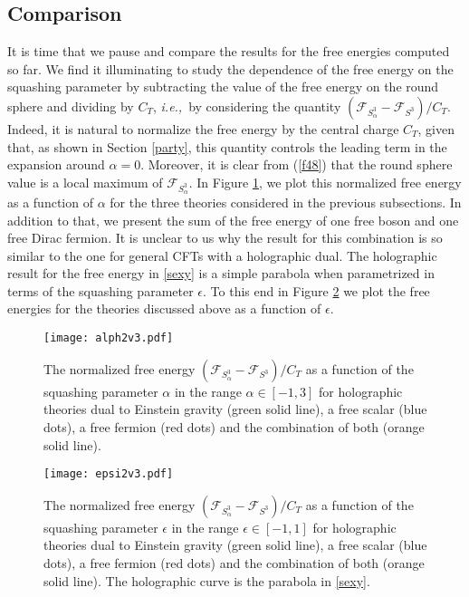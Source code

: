 \documentclass[12pt]{article}
\numberwithin{equation}{section}
\newcommand{\req}[1]{(\ref{#1})} %
\newcommand{\ssc}{\scriptscriptstyle}
\newcommand{\ie}{{\it i.e.,}\ }
\newcommand{\ctt}{C_{\ssc T}}
\begin{document}
\subsection{Comparison}
\label{susti}

It is time that we pause and compare the results for the free energies computed so far. We find it illuminating to study the dependence of the free energy on the squashing parameter by subtracting the value of the free energy on the round sphere and dividing by $\ctt$, \ie by considering the quantity $(\mathcal{F}_{S^3_{\alpha}}-\mathcal{F}_{S^3})/\ctt$.  Indeed, it is natural to normalize the free energy by the central charge $\ctt$, given that, as shown in Section \ref{party}, this quantity controls the leading term in the expansion around $\alpha=0$. Moreover, it is clear from \req{f48} that the round sphere value is a local maximum of $\mathcal{F}_{S^3_{\alpha}}$. In Figure \ref{fig3dalpha}, we plot this normalized free energy as a function of $\alpha$ for the three theories considered in the previous subsections. In addition to that, we present the sum of the free energy of one free boson and one free Dirac fermion. It is unclear to us why the result for this combination is so similar to the one for general CFTs with a holographic dual. The holographic result for the free energy in \eqref{sexy} is a simple parabola when parametrized in terms of the squashing parameter $\epsilon$. To this end in Figure \ref{fig3deps} we plot the free energies for the theories discussed above as a function of $\epsilon$.

\begin{figure}[ht!]
	\centering
	\texttt{[image: alph2v3.pdf]}
	\caption{The normalized free energy $(\mathcal{F}_{S^3_{\alpha}}-\mathcal{F}_{S^3})/\ctt$ as a function of the squashing parameter $\alpha$ in the range $\alpha \in [-1, 3]$ for holographic theories dual to Einstein gravity (green solid line), a free scalar (blue dots), a free fermion (red dots) and the combination of both (orange solid line).}\label{fig3dalpha}
\end{figure}
\begin{figure}[h]
	\centering
	\texttt{[image: epsi2v3.pdf]}
	\caption{The normalized free energy $(\mathcal{F}_{S^3_{\alpha}}-\mathcal{F}_{S^3})/\ctt$ as a function of the squashing parameter $\epsilon$ in the range $\epsilon \in [-1, 1]$ for holographic theories dual to Einstein gravity (green solid line), a free scalar (blue dots), a free fermion (red dots) and the combination of both (orange solid line). The holographic curve is the parabola in \eqref{sexy}. }\label{fig3deps}
\end{figure}
\end{document}
